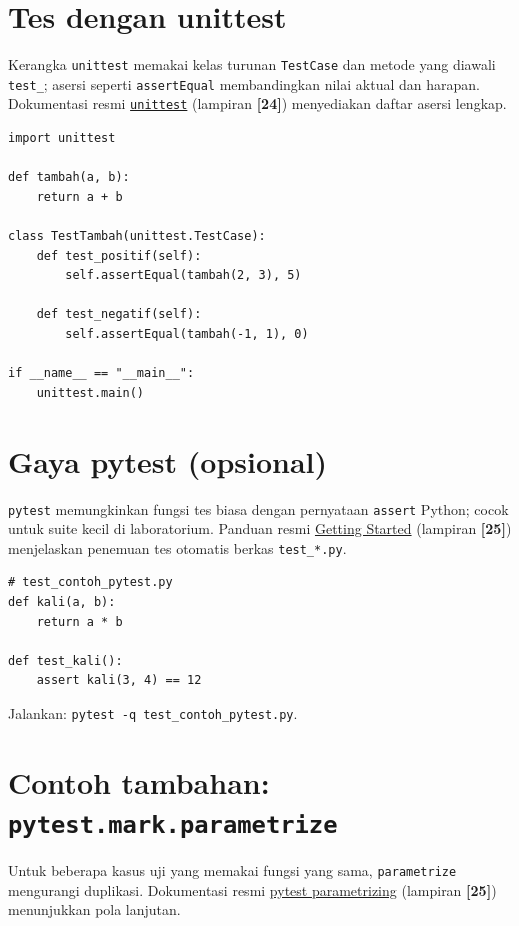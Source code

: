 \documentclass[../main.tex]{subfiles}
\begin{document}
\section{Tes dengan unittest}

\noindent Kerangka \texttt{unittest} memakai kelas turunan \texttt{TestCase} dan metode yang diawali \texttt{test\_}; asersi seperti \texttt{assertEqual} membandingkan nilai aktual dan harapan. Dokumentasi resmi \href{https://docs.python.org/3/library/unittest.html}{\texttt{unittest}} (lampiran \textbf{[24]}) menyediakan daftar asersi lengkap.

\begin{lstlisting}[caption=unittest dasar]
import unittest

def tambah(a, b):
    return a + b

class TestTambah(unittest.TestCase):
    def test_positif(self):
        self.assertEqual(tambah(2, 3), 5)

    def test_negatif(self):
        self.assertEqual(tambah(-1, 1), 0)

if __name__ == "__main__":
    unittest.main()
\end{lstlisting}

\section{Gaya pytest (opsional)}

\noindent \texttt{pytest} memungkinkan fungsi tes biasa dengan pernyataan \texttt{assert} Python; cocok untuk suite kecil di laboratorium. Panduan resmi \href{https://docs.pytest.org/en/stable/getting-started.html}{Getting Started} (lampiran \textbf{[25]}) menjelaskan penemuan tes otomatis berkas \texttt{test\_*.py}.

\begin{lstlisting}[caption=pytest ringkas]
# test_contoh_pytest.py
def kali(a, b):
    return a * b

def test_kali():
    assert kali(3, 4) == 12
\end{lstlisting}

\noindent Jalankan: \texttt{pytest -q test\_contoh\_pytest.py}.

\section{Contoh tambahan: \texttt{pytest.mark.parametrize}}

\noindent Untuk beberapa kasus uji yang memakai fungsi yang sama, \texttt{parametrize} mengurangi duplikasi. Dokumentasi resmi \href{https://docs.pytest.org/en/stable/how-to/parametrize.html}{pytest parametrizing} (lampiran \textbf{[25]}) menunjukkan pola lanjutan.
\end{document}
